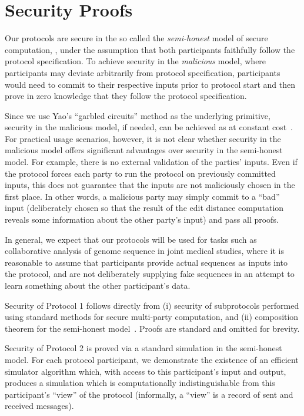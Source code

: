 \section{Security Proofs}

\newcommand{\view}{\mathsf{view}}
\newcommand{\sot}{S^\mathsf{ot}}
\newcommand{\mot}{S^\mathsf{min}}

Our protocols are secure in the so called the \emph{semi-honest} model
of secure computation, \ie, under the assumption that both participants
faithfully follow the protocol specification.  To achieve security in
the \emph{malicious} model, where participants may deviate arbitrarily
from protocol specification, participants would need to commit to their
respective inputs prior to protocol start and then prove in zero knowledge
that they follow the protocol specification.  

Since we use Yao's ``garbled circuits'' method as the underlying
primitive, security in the malicious model, if needed, can be achieved as
at constant cost~\cite{JS07}.  For practical usage scenarios, however, it
is not clear whether security in the malicious model offers significant
advantages over security in the semi-honest model.  For example, there
is no external validation of the parties' inputs.  Even if the protocol
forces each party to run the protocol on previously committed inputs,
this does not guarantee that the inputs are not maliciously chosen in
the first place.  In other words, a malicious party may simply commit
to a ``bad'' input (deliberately chosen so that the result of the edit
distance computation reveals some information about the other party's
input) and pass all proofs.

In general, we expect that our protocols will be used for tasks such as
collaborative analysis of genome sequence in joint medical studies, where
it is reasonable to assume that participants provide actual sequences
as inputs into the protocol, and are not deliberately supplying fake
sequences in an attempt to learn something about the other participant's
data.

Security of Protocol 1 follows directly from (i) security of subprotocols
performed using standard methods for secure multi-party computation,
and (ii) composition theorem for the semi-honest model~\cite[Theorem
7.3.3]{Goldreich:vol2}.  Proofs are standard and omitted for brevity.

Security of Protocol 2 is proved via a standard simulation in the
semi-honest model.  For each protocol participant, we demonstrate the
existence of an efficient simulator algorithm which, with access to
this participant's input and output, produces a simulation which is
computationally indistinguishable from this participant's ``view'' of
the protocol (informally, a ``view'' is a record of sent and received
messages).

